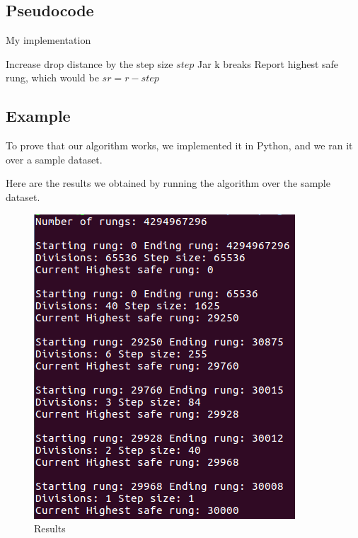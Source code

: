 \documentclass{article}
\begin{document}
\subsection*{Pseudocode}

\begin{algorithm}[H]
\caption{My implementation}
\begin{algorithmic}[1]
  \State Increase drop distance by the step size $step$
   \State Jar k  breaks
   \State Report highest safe rung, which would be $sr = r - step$
   \EndIf
  \EndIf
 \EndWhile
\EndFunction
\end{algorithmic}
\end{algorithm}

\subsection*{Example}

To prove that our algorithm works, we implemented it in Python, and we ran it over a sample dataset.



Here are the results we obtained by running the algorithm over the sample dataset.

\begin{figure}[H]
\begin{center}
\includegraphics[scale=.8]{problem1b}
\end{center}
\caption{Results}
\end{figure}
\end{document}
